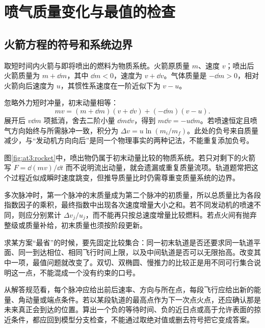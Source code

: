 \section{喷气质量变化与最值的检查}
\subsection{火箭方程的符号和系统边界}

  取短时间内火箭与即将喷出的燃料为物质系统。火箭原质量 $m$、速度 $v$；喷出后火箭质量为 $m+\dd m$，其中 $\dd m<0$，速度为 $v+\dd v$。气体质量是 $-\dd m>0$，相对火箭向后速度为 $u$，其惯性系速度在一阶近似下为 $v-u$。

  忽略外力短时冲量，初末动量相等：
  \[mv=(m+\dd m)(v+\dd v)+(-\dd m)(v-u).
  \]
  展开后 $v\dd m$ 项抵消，舍去二阶小量 $\dd m\dd v$，得到 $m\dd v=-u\dd m$。若喷速恒定且喷气方向始终与所需脉冲一致，积分为 $\Delta v=u\ln(m_i/m_f)$。此处的负号来自质量减少，与“发动机方向向后”是同一个物理事实的两种记法，不能重复添加负号。
  

  图\ref{fig:at3:rocket}中，喷出物仍属于初末动量比较的物质系统。若只对剩下的火箭写 $F=\dd(mv)/\dd t$ 而不说明流出动量，就会遗漏或重复质量流项。轨道题常把这个过程近似成瞬时速度跳变，但推导质量比时仍需尊重变质量系统的边界。

  多次脉冲时，第一个脉冲的末质量成为第二个脉冲的初质量，所以总质量比为各段指数因子的乘积，最终指数中出现各次速度增量大小之和。若不同发动机的喷速不同，则应分别累计 $\Delta v_j/u_j$，而不能再只按总速度增量比较燃料。若点火间有抛弃整级或质量补给，初末质量也须按阶段更新。

  求某方案“最省”的时候，要先固定比较集合：同一初末轨道是否还要求同一轨道平面、同一到达相位、相同飞行时间上限，以及中间轨道是否可以无限抬高。改变其中一项，最值问题就改变了。双切、双椭圆、慢推力的比较正是用不同可行集合说明这一点，不能混成一个没有约束的口号。

  从解答规范看，每个脉冲应给出前后速率、方向与所在点，每段飞行应给出新的能量、角动量或端点条件。若以某段轨道的最高点作为下一次点火点，还应确认那是未来真正会到达的位置。算出一个负的等待时间、负的近日点或高于允许表面的掠近条件，都应回到模型分支检查，不能通过取绝对值或删去符号把它变成答案。
  
